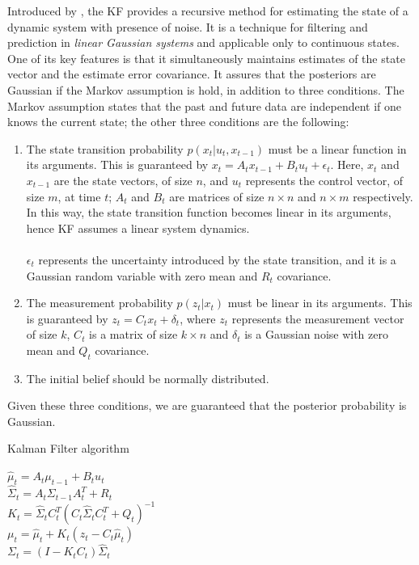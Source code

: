 Introduced by \cite{kalman}, the \ac{KF} provides a recursive method for estimating the state of a dynamic system with presence of noise. It is a technique for filtering and prediction in \emph{linear Gaussian systems} and applicable only to continuous states. One of its key features is that it simultaneously maintains estimates of the state vector and the estimate error covariance. It assures that the posteriors are Gaussian if the Markov assumption is hold, in addition to three conditions. The Markov assumption states that the past and future data are independent if one knows the current state; the other three conditions are the following:
\begin{enumerate}
    \item{The state transition probability $p\left( x_t | u_t, x_{t-1}\right)$ must be a linear function in its arguments. This is guaranteed by $ x_t = A_t x_{t-1} + B_t u_t + \epsilon_t $. Here, $x_t$ and $x_{t-1}$ are the state vectors, of size $n$, and $u_t$ represents the control vector, of size $m$, at time $t$; $A_t$ and $B_t$ are matrices of size $n \times n$ and $n\times m$ respectively. In this way, the state transition function becomes linear in its arguments, hence \ac{KF} assumes a linear system dynamics. \\\\ $\epsilon_t$ represents the uncertainty introduced by the state transition, and it is a Gaussian random variable with zero mean and $R_t$ covariance.}
    \item{The measurement probability $p\left(z_t | x_t\right)$ must be linear in its arguments. This is guaranteed by $z_t = C_t x_t + \delta_t$, where $z_t$ represents the measurement vector of size $k$, $C_t$ is a matrix of size $k \times n$ and $\delta_t$ is a Gaussian noise with zero mean and $Q_t$ covariance.}
    \item{The initial belief should be normally distributed.}
\end{enumerate}
Given these three conditions, we are guaranteed that the posterior probability is Gaussian.

\begin{algorithm}[h]
    \caption{Kalman Filter algorithm}
    \label{alg:chapter1:kf}

    \BlankLine
    \BlankLine
    $\hat\mu_t = A_t \mu_{t-1} + B_t u_t$ \\
    $\hat\Sigma_t = A_t \Sigma_{t-1} A_t^T + R_t$ \\
    \BlankLine
    $K_t = \hat\Sigma_t C_t^T \left(C_t \hat\Sigma_t C_t^T + Q_t\right)^{-1}$ \\
    $\mu_t = \hat\mu_t + K_t \left(z_t - C_t \hat\mu_t \right) $ \\
    $\Sigma_t = (I - K_t C_t) \hat\Sigma_t$ \\
    \BlankLine
\end{algorithm}

